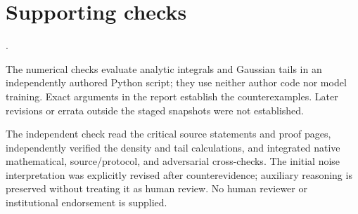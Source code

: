 \documentclass[10pt]{article}
\begin{document}
\section*{Supporting checks}
.\par
The numerical checks evaluate analytic integrals and Gaussian tails in an independently authored Python script; they use neither author code nor model training. Exact arguments in the report establish the counterexamples. Later revisions or errata outside the staged snapshots were not established.\par
The independent check read the critical source statements and proof pages, independently verified the density and tail calculations, and integrated native mathematical, source/protocol, and adversarial cross-checks. The initial noise interpretation was explicitly revised after counterevidence; auxiliary reasoning is preserved without treating it as human review. No human reviewer or institutional endorsement is supplied.\par
\end{document}
